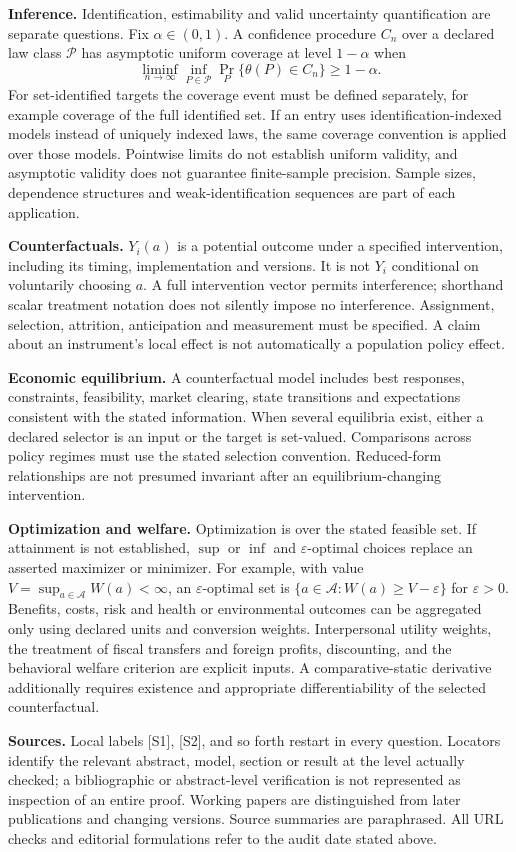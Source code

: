 \documentclass[11pt,a4paper]{article}
\begin{document}
\textbf{Inference.} Identification, estimability and valid uncertainty quantification are separate questions. Fix $\alpha\in(0,1)$. A confidence procedure $C_n$ over a declared law class $\mathcal P$ has asymptotic uniform coverage at level $1-\alpha$ when
\[
\liminf_{n\to\infty}\inf_{P\in\mathcal P}\Pr_P\{\theta(P)\in C_n\}\geq1-\alpha.
\]
For set-identified targets the coverage event must be defined separately, for example coverage of the full identified set. If an entry uses identification-indexed models instead of uniquely indexed laws, the same coverage convention is applied over those models. Pointwise limits do not establish uniform validity, and asymptotic validity does not guarantee finite-sample precision. Sample sizes, dependence structures and weak-identification sequences are part of each application.

\textbf{Counterfactuals.} $Y_i(a)$ is a potential outcome under a specified intervention, including its timing, implementation and versions. It is not $Y_i$ conditional on voluntarily choosing $a$. A full intervention vector permits interference; shorthand scalar treatment notation does not silently impose no interference. Assignment, selection, attrition, anticipation and measurement must be specified. A claim about an instrument's local effect is not automatically a population policy effect.

\textbf{Economic equilibrium.} A counterfactual model includes best responses, constraints, feasibility, market clearing, state transitions and expectations consistent with the stated information. When several equilibria exist, either a declared selector is an input or the target is set-valued. Comparisons across policy regimes must use the stated selection convention. Reduced-form relationships are not presumed invariant after an equilibrium-changing intervention.

\textbf{Optimization and welfare.} Optimization is over the stated feasible set. If attainment is not established, $\sup$ or $\inf$ and $\varepsilon$-optimal choices replace an asserted maximizer or minimizer. For example, with value $V=\sup_{a\in\mathcal A}W(a)<\infty$, an $\varepsilon$-optimal set is $\{a\in\mathcal A:W(a)\geq V-\varepsilon\}$ for $\varepsilon>0$. Benefits, costs, risk and health or environmental outcomes can be aggregated only using declared units and conversion weights. Interpersonal utility weights, the treatment of fiscal transfers and foreign profits, discounting, and the behavioral welfare criterion are explicit inputs. A comparative-static derivative additionally requires existence and appropriate differentiability of the selected counterfactual.

\textbf{Sources.} Local labels [S1], [S2], and so forth restart in every question. Locators identify the relevant abstract, model, section or result at the level actually checked; a bibliographic or abstract-level verification is not represented as inspection of an entire proof. Working papers are distinguished from later publications and changing versions. Source summaries are paraphrased. All URL checks and editorial formulations refer to the audit date stated above.
\end{document}
